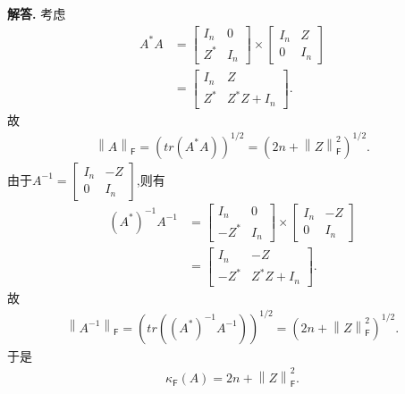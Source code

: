 \documentclass[12pt, a4paper, oneside, UTF8]{ctexart}
\newenvironment{solution}{\par\noindent\textbf{解答. }}{\par}
\begin{document}
\begin{solution}
    考虑
    \begin{align*}
        {A^*}{A}&=\left[
        \begin{array}{cccc}	
            I_n & 0 \\
            Z^* & I_n
        \end{array}
    \right]\times\left[
        \begin{array}{cccc}	
            I_n & Z \\
            0 & I_n
        \end{array}
    \right]\\
    &=\left[
        \begin{array}{cccc}	
            I_n & Z \\
            Z^* & {Z^*}{Z}+I_n
        \end{array}
    \right].
    \end{align*}
    故
    \begin{align*}
        {\left\lVert{A}\right\rVert}_{\mathsf{F}}=(tr({A^*}{A}))^{1/2}=(2n+{\left\lVert{Z}\right\rVert}_{\mathsf{F}}^2)^{1/2}.
    \end{align*}
    由于${A^{-1}}=\left[
        \begin{array}{cccc}	
            I_n & -Z \\
            0 & I_n
        \end{array}
    \right]$,则有
    \begin{align*}
        {(A^*)^{-1}}{A^{-1}}&=\left[
        \begin{array}{cccc}	
            I_n & 0 \\
            -Z^* & I_n
        \end{array}
    \right]\times\left[
        \begin{array}{cccc}	
            I_n & -Z \\
            0 & I_n
        \end{array}
    \right]\\
    &=\left[
        \begin{array}{cccc}	
            I_n & -Z \\
            -Z^* & {Z^*}{Z}+I_n
        \end{array}
    \right].
    \end{align*}
    故
    \begin{align*}
        {\left\lVert{A^{-1}}\right\rVert}_{\mathsf{F}}=(tr({(A^*)^{-1}}{A^{-1}}))^{1/2}=(2n+{\left\lVert{Z}\right\rVert}_{\mathsf{F}}^2)^{1/2}.
    \end{align*}
    于是
    \begin{align*}
        \kappa_{\mathsf{F}}(A)=2n+{\left\lVert{Z}\right\rVert}_{\mathsf{F}}^2.
    \end{align*}
\end{solution}
\end{document}
